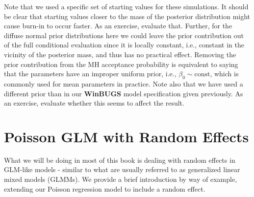 Note that we used a specific set of starting values for these
simulations. It should be clear that starting values closer to the
mass of the posterior distribution might cause burn-in to occur
faster. As an exercise, evaluate that.  
Further, for the diffuse normal prior distributions
here we could leave the prior contribution out of the full conditional
evaluation since it is locally constant, i.e., constant in the vicinity of
the posterior mass, and thus has no practical effect. Removing the
prior contribution from the MH acceptance probability is equivalent to
saying that the parameters have an improper uniform prior, i.e.,
$\beta_0 \sim \mbox{const}$, which is commonly used for mean parameters
in practice.
Note also that we have
used a different prior than in our {\bf WinBUGS} model specification
given previously. As an
exercise, evaluate whether this seems to affect the result.

\section{Poisson GLM with Random Effects}

What we will be doing in most of this book is dealing with random
effects in GLM-like models - similar to what
are usually referred to as generalized
linear mixed models (GLMMs). We provide a brief introduction by way of
example, extending our Poisson regression model to include a random effect.


